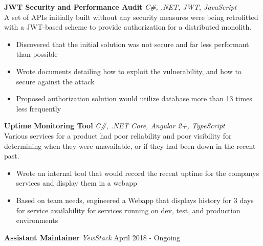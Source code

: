 \documentclass[a4paper]{article}
\begin{document}
\begin{addmargin}[1em]{2em}%
{\textbf{JWT Security and Performance Audit}} {\sl C\#, .NET, JWT, JavaScript} \\
A set of APIs initially built without any security measures were being retrofitted with a JWT-based scheme to provide authorization for a distributed monolith.
\vspace*{-2mm}
\begin{itemize}[leftmargin=4.5mm] \itemsep -1mm
	\item Discovered that the initial solution was not secure and far less performant than possible
	\item Wrote documents detailing how to exploit the vulnerability, and how to secure against the attack%
    \item Proposed authorization solution would utilize database more than 13 times less frequently
\end{itemize}
\vspace*{2mm}

{\textbf{Uptime Monitoring Tool}} {\sl C\#, .NET Core, Angular 2+, TypeScript} \\
Various services for a product had poor reliability and poor visibility for determining when they were unavailable, or if they had been down in the recent past.
\vspace*{-2mm}
\begin{itemize}[leftmargin=4.5mm] \itemsep -1mm 
	\item Wrote an internal tool that would record the recent uptime for the company\textquotesingle{}s services and display them in a webapp
    \item Based on team needs, engineered a Webapp that displays history for 3 days for service availability for services running on dev, test, and production environments
\end{itemize}
\vspace*{2mm}
\end{addmargin}





\textbf{Assistant Maintainer} \textit{YewStack} \hfill April 2018 - Ongoing\\
\end{document}
